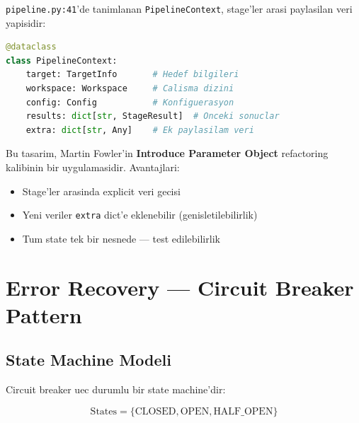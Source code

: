 \documentclass[12pt,a4paper,oneside]{book}
\theoremstyle{definition}
\newcommand{\code}[1]{\texttt{\color{green!60!white}#1}}
\newcommand{\file}[1]{\texttt{\color{yellow!70!white}#1}}
\begin{document}
\file{pipeline.py:41}'de tanimlanan \code{PipelineContext}, stage'ler arasi paylasilan veri yapisidir:

\begin{lstlisting}[language=Python,caption={PipelineContext veri yapisi}]
@dataclass
class PipelineContext:
    target: TargetInfo       # Hedef bilgileri
    workspace: Workspace     # Calisma dizini
    config: Config           # Konfiguerasyon
    results: dict[str, StageResult]  # Onceki sonuclar
    extra: dict[str, Any]    # Ek paylasilam veri
\end{lstlisting}

Bu tasarim, Martin Fowler'in \textbf{Introduce Parameter Object} refactoring kalibinin bir uygulamasidir. Avantajlari:

\begin{itemize}
\item Stage'ler arasinda explicit veri gecisi
\item Yeni veriler \code{extra} dict'e eklenebilir (genisletilebilirlik)
\item Tum state tek bir nesnede --- test edilebilirlik
\end{itemize}

\section{Error Recovery --- Circuit Breaker Pattern}
\label{sec:error-recovery}

\subsection{State Machine Modeli}

Circuit breaker uec durumlu bir state machine'dir:

\begin{equation}
\text{States} = \{\text{CLOSED}, \text{OPEN}, \text{HALF\_OPEN}\}
\end{equation}

\begin{center}
\end{center}
\end{document}
